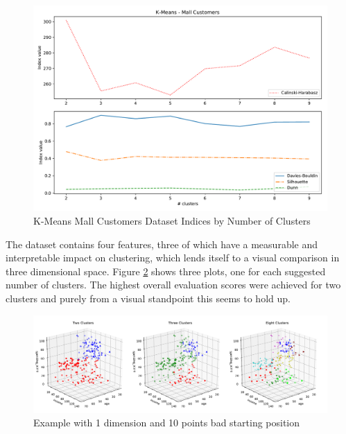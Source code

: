 \begin{figure}[h]
\caption{K-Means Mall Customers Dataset Indices by Number of Clusters}
\begin{center}
\includegraphics[width=1.0\textwidth]{images/kmeans_customers_index_plot.pdf}
\end{center}
\label{fig:kmeans_customers_comparison_plot}
\end{figure}

The dataset contains four features, three of which have a measurable and interpretable impact on clustering, which lends itself to a visual comparison in three dimensional space. Figure \ref{fig:kmeans_customers_3d_multi} shows three plots, one for each suggested number of clusters. The highest overall evaluation scores were achieved for two clusters and purely from a visual standpoint this seems to hold up.

\begin{figure}[h]
\caption{Example with 1 dimension and 10 points bad starting position}
\begin{center}
\includegraphics[width=1.0\textwidth]{images/kmeans_mall_3d_multi.pdf}
\end{center}
\label{fig:kmeans_customers_3d_multi}
\end{figure}

